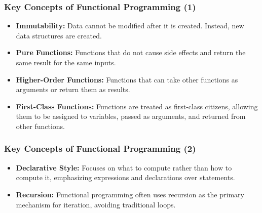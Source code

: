 \documentclass[aspectratio=169, table]{beamer}
\begin{document}
\begin{frame}
	\frametitle{Key Concepts of Functional Programming (1)}
	\begin{itemize}
		\item \textbf{Immutability:} Data cannot be modified after it is created. Instead, new data structures are created.
		\item \textbf{Pure Functions:} Functions that do not cause side effects and return the same result for the same inputs.
		\item \textbf{Higher-Order Functions:} Functions that can take other functions as arguments or return them as results.
		\item \textbf{First-Class Functions:} Functions are treated as first-class citizens, allowing them to be assigned to variables, passed as arguments, and returned from other functions.
	\end{itemize}
\end{frame}

\begin{frame}
	\frametitle{Key Concepts of Functional Programming (2)}
	\begin{itemize}
		\item \textbf{Declarative Style:} Focuses on what to compute rather than how to compute it, emphasizing expressions and declarations over statements.
		\item \textbf{Recursion:} Functional programming often uses recursion as the primary mechanism for iteration, avoiding traditional loops.
	\end{itemize}
\end{frame}
\end{document}
